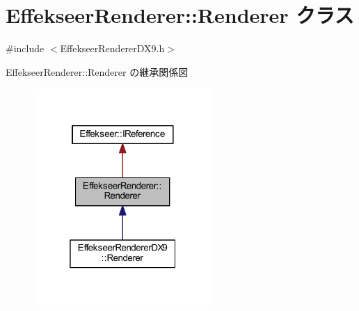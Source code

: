 \hypertarget{class_effekseer_renderer_1_1_renderer}{}\section{Effekseer\+Renderer\+:\+:Renderer クラス}
\label{class_effekseer_renderer_1_1_renderer}


{\ttfamily \#include $<$Effekseer\+Renderer\+D\+X9.\+h$>$}



Effekseer\+Renderer\+:\+:Renderer の継承関係図\nopagebreak
\begin{figure}[H]
\begin{center}
\leavevmode
\includegraphics[width=193pt]{class_effekseer_renderer_1_1_renderer__inherit__graph}
\end{center}
\end{figure}
